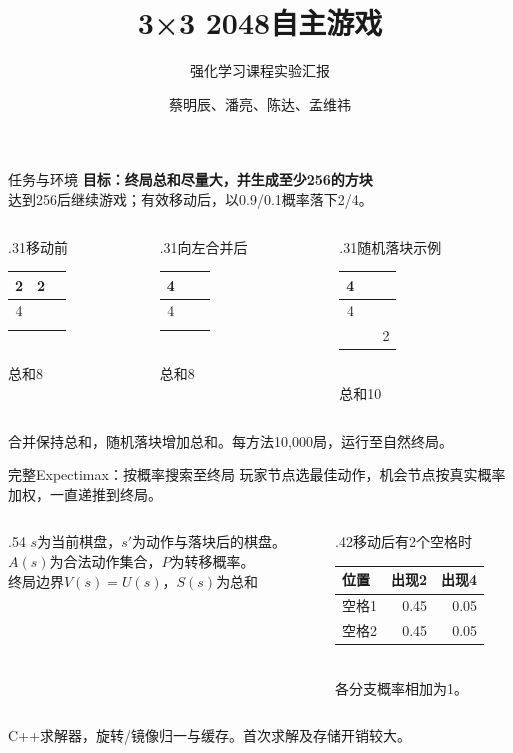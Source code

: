 \documentclass[11pt]{beamer}
\title{3×3 2048自主游戏}
\subtitle{强化学习课程实验汇报}
\author{蔡明辰、潘亮、陈达、孟维祎}
\date{}
\newcommand{\smalltext}{\fontsize{9pt}{12pt}\selectfont}
\newcommand{\board}[3]{\begingroup\renewcommand{\arraystretch}{1.45}\setlength{\tabcolsep}{9pt}\begin{tabular}{|c|c|c|}\hline#1\\\hline#2\\\hline#3\\\hline\end{tabular}\endgroup}
\begin{document}
\maketitle
{}
\begin{frame}{任务与环境}
\textbf{目标：终局总和尽量大，并生成至少256的方块}\\[3mm]
\smalltext 达到256后继续游戏；有效移动后，以0.9/0.1概率落下2/4。\\[4mm]
\begin{columns}[T,onlytextwidth]
\begin{column}{.31\textwidth}\centering 移动前\\[1mm]\board{2&2&}{4&&}{&&}\\[1mm]总和8\end{column}
\begin{column}{.31\textwidth}\centering 向左合并后\\[1mm]\board{4&&}{4&&}{&&}\\[1mm]总和8\end{column}
\begin{column}{.31\textwidth}\centering 随机落块示例\\[1mm]\board{4&&}{4&&}{&&\textcolor{revisionpurple}{2}}\\[1mm]总和10\end{column}
\end{columns}\vspace{3mm}
\smalltext 合并保持总和，随机落块增加总和。每方法10,000局，运行至自然终局。
\end{frame}
\begin{frame}{完整Expectimax：按概率搜索至终局}
\smalltext 玩家节点选最佳动作，机会节点按真实概率加权，一直递推到终局。
{\large\[\]}
\begin{columns}[T,onlytextwidth]
\begin{column}{.54\textwidth}\smalltext
$s$为当前棋盘，$s'$为动作与落块后的棋盘。\\[1mm]
$A(s)$为合法动作集合，$P$为转移概率。\\[2mm]
终局边界$V(s)=U(s)$，$S(s)$为总和
{\large\[\]}
\end{column}
\begin{column}{.42\textwidth}\smalltext 移动后有2个空格时\\[1.5mm]
\begin{tabular}{@{}lrr@{}}\toprule 位置&出现2&出现4\\\midrule 空格1&0.45&0.05\\空格2&0.45&0.05\\\bottomrule\end{tabular}\\[1.5mm]各分支概率相加为1。\end{column}
\end{columns}\vspace{1mm}\smalltext C++求解器，旋转/镜像归一与缓存。首次求解及存储开销较大。
\end{frame}
\end{document}
